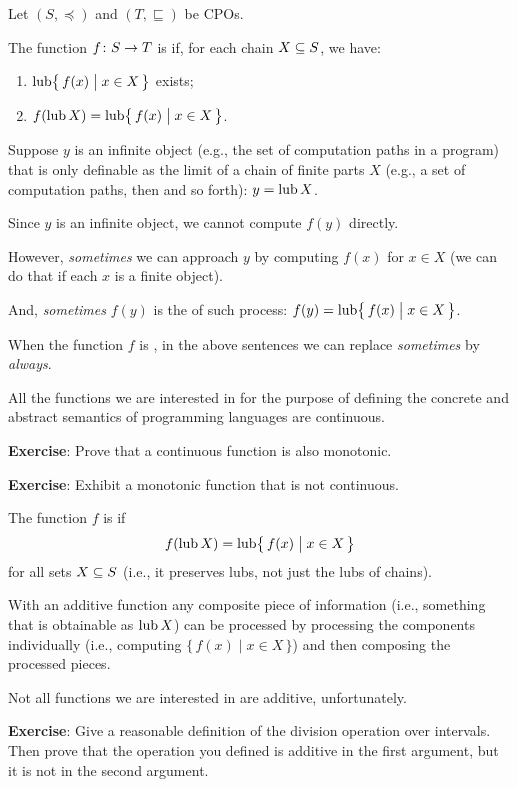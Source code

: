 \documentclass[online,helvetica,a4]{chaksem}
\begin{document}
\begin{slide} 

Let $(S, \preceq)$ and $(T, \sqsubseteq)$ be CPOs.

The function $\mathord{f}\colon S\to T$ is  if,
for each chain $X \subseteq S$, we have:
\begin{enumerate}
\item
$\mathop{\mathrm{lub}}\nolimits\bigl\{\, f(x) \bigm| x \in X \,\bigr\}$ exists;
\item
$f(\mathop{\mathrm{lub}}\nolimits X) = \mathop{\mathrm{lub}}\nolimits\bigl\{\, f(x) \bigm| x \in X \,\bigr\}$.
\end{enumerate}

Suppose $y$ is an infinite object
(e.g., the set of  computation paths in a program)
that is only definable as the limit of a chain of finite parts $X$
(e.g., a set of  computation paths, then 
and so forth): $y = \mathop{\mathrm{lub}}\nolimits X$.

Since $y$ is an infinite object, we cannot compute $f(y)$ directly.
\end{slide}

\begin{slide} 

However, \emph{sometimes} we can approach $y$ by computing $f(x)$ for $x \in X$
(we can do that if each $x$ is a finite object).

And, \emph{sometimes} $f(y)$ is the  of such process:
$f(y) = \mathop{\mathrm{lub}}\nolimits\bigl\{\, f(x) \bigm| x \in X \,\bigr\}$.

When the function $f$ is , in the above sentences
we can replace \emph{sometimes} by \emph{always}.

All the functions we are interested in for the purpose of defining the
concrete and abstract semantics of programming languages are continuous.

\vfill
\textbf{Exercise}: Prove that a continuous function is also monotonic.

\vfill
\textbf{Exercise}: Exhibit a monotonic function that is not continuous.

\end{slide}

\begin{slide} 

The function $f$ is  if
\[
        f(\mathop{\mathrm{lub}}\nolimits X) = \mathop{\mathrm{lub}}\nolimits\bigl\{\, f(x) \bigm| x \in X \,\bigr\}
\]
for all sets $X \subseteq S$ (i.e., it preserves  lubs, not just
the lubs of chains).

With an additive function
any composite piece of information (i.e., something that is obtainable
as $\mathop{\mathrm{lub}}\nolimits X$) can be processed by processing the components individually
(i.e., computing $\{\, f(x) \mid x \in X \,\}$)
and then composing the processed pieces.

Not all functions we are interested in are additive, unfortunately.

\vfill
\textbf{Exercise}: Give a reasonable definition of the division operation
over intervals.  Then prove that the operation you defined is additive
in the first argument, but it is not in the second argument.

\end{slide}
\end{document}
